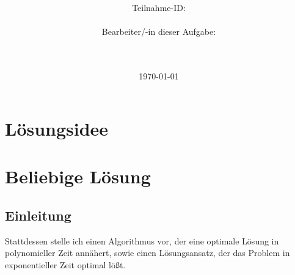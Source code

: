\documentclass[a4paper,10pt,ngerman]{scrartcl}
\title{\textbf{\Huge\Aufgabe}}
\author{\LARGE Teilnahme-ID: \LARGE \TeilnahmeId \\\\
  \LARGE Bearbeiter/-in dieser Aufgabe: \\
  \LARGE \Name\\\\}
\date{\LARGE\today}
\begin{document}
\maketitle
\tableofcontents

\vspace{0.5cm}

\section{Lösungsidee}
\section{Beliebige Lösung}
\subsection{Einleitung}Stattdessen stelle ich einen Algorithmus vor, der eine optimale
Lösung in polynomieller Zeit annähert, sowie einen Lösungsansatz, der das
Problem in exponentieller Zeit optimal lößt.
\end{document}

